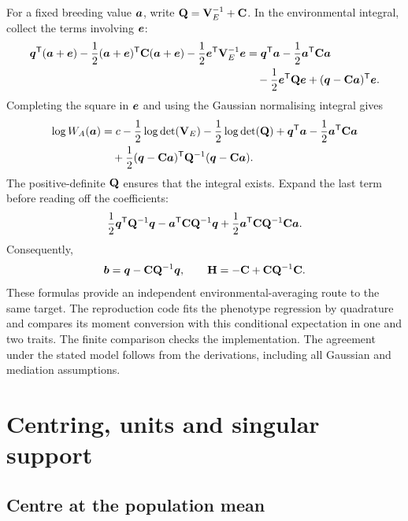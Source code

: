 For a fixed breeding value \(\boldsymbol{a}\), write
\(\mathbf{Q}=\mathbf{V}_E^{-1}+\mathbf{C}\). In the environmental integral, collect
the terms involving \(\boldsymbol{e}\):
\begin{align*}
 \boldsymbol{q}^{\mathsf T}(\boldsymbol{a}+\boldsymbol{e})
 -\frac12(\boldsymbol{a}+\boldsymbol{e})^{\mathsf T}\mathbf{C}(\boldsymbol{a}+\boldsymbol{e})
 -\frac12\boldsymbol{e}^{\mathsf T}\mathbf{V}_E^{-1}\boldsymbol{e}
 &=
 \boldsymbol{q}^{\mathsf T}\boldsymbol{a}-\frac12\boldsymbol{a}^{\mathsf T}\mathbf{C}\boldsymbol{a}\\
 &\quad-\frac12\boldsymbol{e}^{\mathsf T}\mathbf{Q}\boldsymbol{e}
       +(\boldsymbol{q}-\mathbf{C}\boldsymbol{a})^{\mathsf T}\boldsymbol{e}.
\end{align*}
Completing the square in \(\boldsymbol{e}\) and using the Gaussian normalising
integral gives
\begin{align}
 \log W_A(\boldsymbol{a})
 &=c-\frac12\log\det(\mathbf{V}_E)-\frac12\log\det(\mathbf{Q})
     +\boldsymbol{q}^{\mathsf T}\boldsymbol{a}
     -\frac12\boldsymbol{a}^{\mathsf T}\mathbf{C}\boldsymbol{a}\nonumber\\
 &\quad+\frac12(\boldsymbol{q}-\mathbf{C}\boldsymbol{a})^{\mathsf T}
                    \mathbf{Q}^{-1}(\boldsymbol{q}-\mathbf{C}\boldsymbol{a}).
 \label{conversion:multivariate_environment}
\end{align}
The positive-definite \(\mathbf{Q}\) ensures that the integral exists. Expand the
last term before reading off the coefficients:
\[
 \frac12\boldsymbol{q}^{\mathsf T}\mathbf{Q}^{-1}\boldsymbol{q}
 -\boldsymbol{a}^{\mathsf T}\mathbf{C}\mathbf{Q}^{-1}\boldsymbol{q}
 +\frac12\boldsymbol{a}^{\mathsf T}\mathbf{C}\mathbf{Q}^{-1}\mathbf{C}\boldsymbol{a}.
\]
Consequently,
\begin{equation}
 \boldsymbol{b}=\boldsymbol{q}-\mathbf{C}\mathbf{Q}^{-1}\boldsymbol{q},\qquad
 \mathbf{H}=-\mathbf{C}+\mathbf{C}\mathbf{Q}^{-1}\mathbf{C}.
 \label{conversion:environment_parameters}
\end{equation}
These formulas provide an independent environmental-averaging route to the
same target. The reproduction code fits the phenotype regression by
quadrature and compares its moment conversion with this conditional
expectation in one and two traits. The finite comparison checks the
implementation. The agreement under the stated model follows from the
derivations, including all Gaussian and mediation assumptions.

\section{Centring, units and singular support}
\label{conversion:coordinates}

\subsection{Centre at the population mean}

